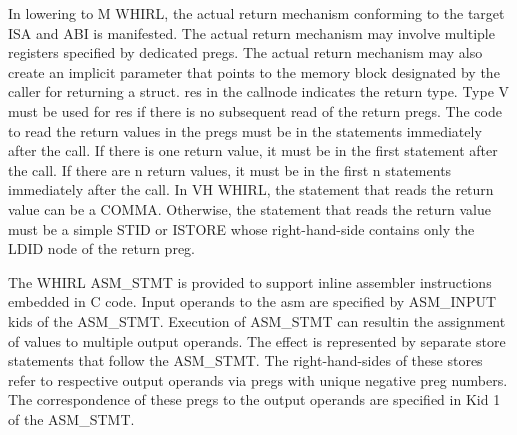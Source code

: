 \documentclass{article}
\begin{document}
In lowering to M WHIRL, the actual return mechanism conforming
to the target ISA and ABI is manifested. The actual return mechanism
may involve multiple registers specified by dedicated pregs. The
actual return mechanism may also create an implicit parameter that
points to the memory block designated by the caller for returning
a struct. res in the callnode indicates the return type. Type V
must be used for res if there is no subsequent read of the return
pregs. The code to read the return values in the pregs must be in
the statements immediately after the call. If there is one return
value, it must be in the first statement after the call. If there
are n return values, it must be in the first n statements immediately
after the call. In VH WHIRL, the statement that reads the return
value can be a
%
COMMA. Otherwise, the statement that reads the
return value must be a simple
%
STID or
%
ISTORE whose right-hand-side contains only the
%
LDID node of
the return preg.

The WHIRL 
%
ASM\_STMT is provided to support inline assembler
instructions embedded in C code. Input operands to the asm are
specified by 
%
ASM\_INPUT kids of the 
%
ASM\_STMT. Execution of 
%
ASM\_STMT
can resultin the assignment of values to multiple output operands.
The effect is represented by separate store statements that follow
the ASM\_STMT. The right-hand-sides of these stores refer to respective
output operands via pregs with unique negative preg numbers. The
correspondence of these pregs to the output operands are specified
in Kid 1 of the 
%
ASM\_STMT.
\end{document}

